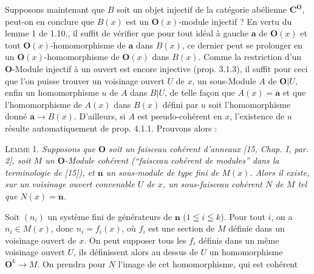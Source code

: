 Supposons maintenant que $B$ soit un objet injectif de la catégorie abélienne
$\mathbf C^{\mathbf O}$, peut-on en conclure que $B(x)$ est un ${\mathbf O}(x)$-module injectif ? En vertu
du lemme 1 de 1.10., il suffit de vérifier que pour tout idéal à gauche $\mathbf a$ de
${\mathbf O}(x)$ et tout ${\mathbf O}(x)$-homomorphisme de $\mathbf a$ dans $B(x)$, ce dernier peut se
prolonger en un ${\mathbf O}(x)$-homomorphisme de ${\mathbf O}(x)$ dans $B(x)$. Comme la
restriction d'un ${\mathbf O}$-Module injectif à un ouvert est encore injective (prop.
3.1.3), il suffit pour ceci que l'on puisse trouver un voisinage ouvert $U$ de
$x$, un sous-Module $A$ de ${\mathbf O}|U$, enfin un homomorphisme $u$ de $A$ dans
$B|U$, de telle façon que $A(x)=\mathbf a$ et que l'homomorphisme de $A(x)$ dans
$B(x)$ défini par $u$ soit l'homomorphisme donné $\mathbf a\to B(x)$.
D'ailleurs, si $A$ est pseudo-cohérent en $x$, l'existence de $u$ résulte
automatiquement de prop. 4.1.1. Prouvons alors :

\textsc{Lemme 1.} \textit{Supposons que ${\mathbf O}$ soit un faisceau cohérent
d'anneaux \textup{[15, Chap. I, par. 2]}, soit $M$ un ${\mathbf O}$-Module cohérent \textup{(}``faisceau
cohérent de modules'' dans la terminologie de \textup{[15])}, et $\mathbf n$ un sous-module de
type fini de $M(x)$. Alors il existe, sur un voisinage ouvert convenable $U$ de
$x$, un sous-faisceau cohérent $N$ de $M$ tel que $N(x)=\mathbf n$.}

Soit $(n_i)$ un système fini de générateurs de $\mathbf n$ ($1\leqq i\leqq k$). Pour
tout $i$, on a $n_i\in M(x)$, donc $n_i=f_i(x)$, où $f_i$ est une section de
$M$ définie dans un voisinage ouvert de $x$. On peut supposer tous les $f_i$
définis dans un même voisinage ouvert $U$, ils définissent alors au dessus de
$U$ un homomorphisme ${\mathbf O}^k\to M$. On prendra pour $N$ l'image de
cet homomorphisme, qui est cohérent

